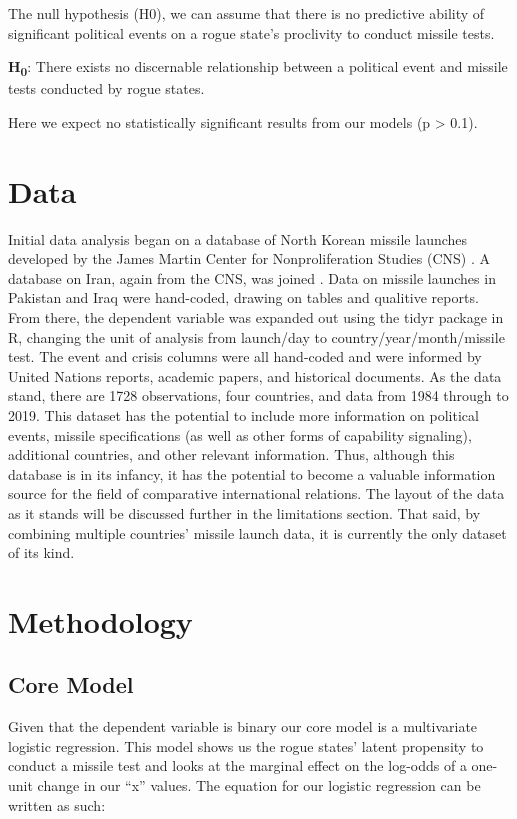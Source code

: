 \documentclass[12pt]{article}
\begin{document}
\doublespacing
The null hypothesis (H0), we can assume that there is no predictive ability of significant political events on a rogue state’s proclivity to conduct missile tests.

\singlespacing
\textbf{H\textsubscript{0}}: There exists no discernable relationship between a political event and missile tests conducted by rogue states.

\doublespacing
Here we expect no statistically significant results from our models (p > 0.1). 

\section{Data}
Initial data analysis began on a database of North Korean missile launches developed by the James Martin Center for Nonproliferation Studies (CNS) . A database on Iran, again from the CNS, was joined . Data on missile launches in Pakistan and Iraq were hand-coded, drawing on tables and qualitive reports. From there, the dependent variable was expanded out using the tidyr package in R, changing the unit of analysis from launch/day to country/year/month/missile test. The event and crisis columns were all hand-coded and were informed by United Nations reports, academic papers, and historical documents. As the data stand, there are 1728 observations, four countries, and data from 1984 through to 2019. This dataset has the potential to include more information on political events, missile specifications (as well as other forms of capability signaling), additional countries, and other relevant information. Thus, although this database is in its infancy, it has the potential to become a valuable information source for the field of comparative international relations. The layout of the data as it stands will be discussed further in the limitations section. That said, by combining multiple countries’ missile launch data, it is currently the only dataset of its kind.

\section{Methodology}
\subsection{Core Model}
Given that the dependent variable is binary our core model is a multivariate logistic regression. This model shows us the rogue states’ latent propensity to conduct a missile test and looks at the marginal effect on the log-odds of a one-unit change in our “x” values. The equation for our logistic regression can be written as such:
\end{document}

